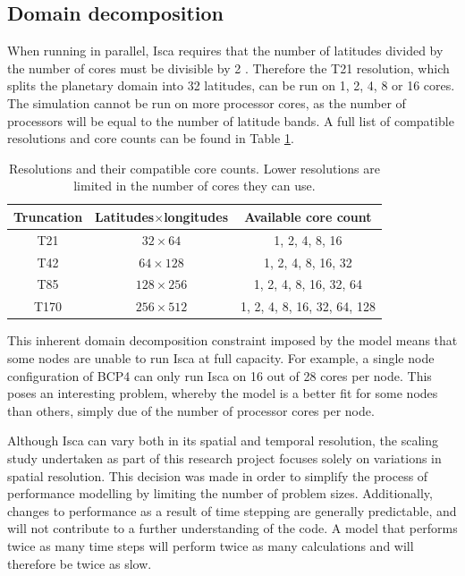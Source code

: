 \documentclass[a4paper,11pt]{report}
\begin{document}
\subsection{Domain decomposition}
When running in parallel, Isca requires that the number of latitudes divided by the number of cores must be divisible by 2 \cite{isca2019github}. Therefore the T21 resolution, which splits the planetary domain into 32 latitudes, can be run on 1, 2, 4, 8 or 16 cores. The simulation cannot be run on more processor cores, as the number of processors will be equal to the number of latitude bands. A full list of compatible resolutions and core counts can be found in Table \ref{tbl:resolutions}.

\begin{table}[htbp]
\caption[Resolutions and their compatible core counts]{Resolutions and their compatible core counts. Lower resolutions are limited in the number of cores they can use.}
\begin{center}
\begin{tabular}{ c c c }
\toprule
Truncation 	& Latitudes$\times$longitudes 		& Available core count \\\midrule
 T21 			& $32\times64$					& 1, 2, 4, 8, 16 \\  
 T42 			& $64\times128$				& 1, 2, 4, 8, 16, 32 \\
 T85 			& $128\times256$ 				& 1, 2, 4, 8, 16, 32, 64 \\
 T170 		& $256\times512$ 				& 1, 2, 4, 8, 16, 32, 64, 128    \\\bottomrule
\end{tabular}
\label{tbl:resolutions}
\end{center}
\end{table}
\par
This inherent domain decomposition constraint imposed by the model means that some nodes are unable to run Isca at full capacity. For example, a single node configuration of BCP4 can only run  Isca on 16 out of 28 cores per node. This poses an interesting problem, whereby the model is a better fit for some nodes than others, simply due of the number of processor cores per node. 
\par
Although Isca can vary both in its spatial and temporal resolution, the scaling study undertaken as part of this research project focuses solely on variations in spatial resolution. This decision was made in order to simplify the process of performance modelling by limiting the number of problem sizes. Additionally, changes to performance as a result of time stepping are generally predictable, and will not contribute to a further understanding of the code. A model that performs twice as many time steps will perform twice as many calculations and will therefore be twice as slow. 
\end{document}
